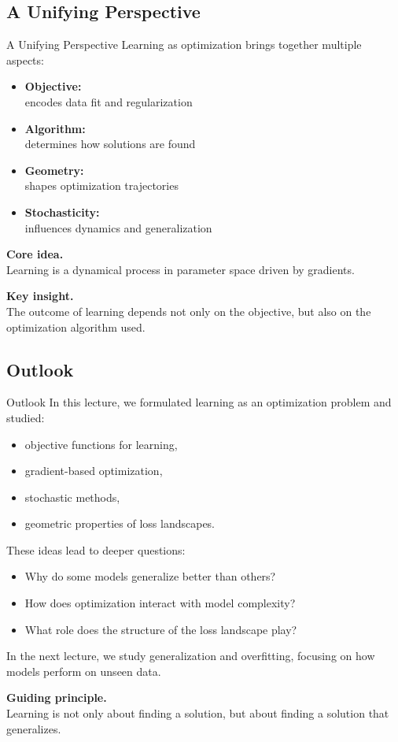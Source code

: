 \documentclass[aspectratio=169,11pt]{beamer}
\begin{document}
\subsection{A Unifying Perspective}
\begin{frame}[t,allowframebreaks]{A Unifying Perspective}
\small
Learning as optimization brings together multiple aspects:

\begin{itemize}
    \item \textbf{Objective:}\\ encodes data fit and regularization
    \item \textbf{Algorithm:}\\ determines how solutions are found
    \item \textbf{Geometry:}\\ shapes optimization trajectories
    \item \textbf{Stochasticity:}\\ influences dynamics and generalization
\end{itemize}

\textbf{Core idea.}\\ Learning is a dynamical process in parameter space driven by gradients.

\textbf{Key insight.}\\ The outcome of learning depends not only on the objective, but also on the optimization algorithm used.
\end{frame}

\subsection{Outlook}
\begin{frame}[t,allowframebreaks]{Outlook}
\small
In this lecture, we formulated learning as an optimization problem and studied:

\begin{itemize}
    \item objective functions for learning,
    \item gradient-based optimization,
    \item stochastic methods,
    \item geometric properties of loss landscapes.
\end{itemize}

These ideas lead to deeper questions:

\begin{itemize}
    \item Why do some models generalize better than others?
    \item How does optimization interact with model complexity?
    \item What role does the structure of the loss landscape play?
\end{itemize}

In the next lecture, we study generalization and overfitting, focusing on how models perform on unseen data.

\textbf{Guiding principle.}\\ Learning is not only about finding a solution, but about finding a solution that generalizes.
\end{frame}
\end{document}
